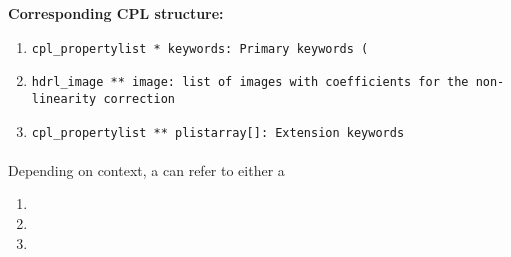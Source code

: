 \begin{datastructdef}
\textbf{Corresponding \ac{CPL} structure:}
\begin{enumerate}
    \item \texttt{cpl\_propertylist * keywords: Primary keywords (}
    \item \texttt{hdrl\_image ** image: list of images with coefficients for the non-linearity correction}
    \item \texttt{cpl\_propertylist ** plistarray[]: Extension keywords}
\end{enumerate}
\end{datastructdef}

\paragraph{}\label{dataitem:master_dark_det}
\label{dataitem:masterdark}
Depending on context, a  can refer to either a
\begin{enumerate}
\item {}
\item {}
\item {}
\end{enumerate}


